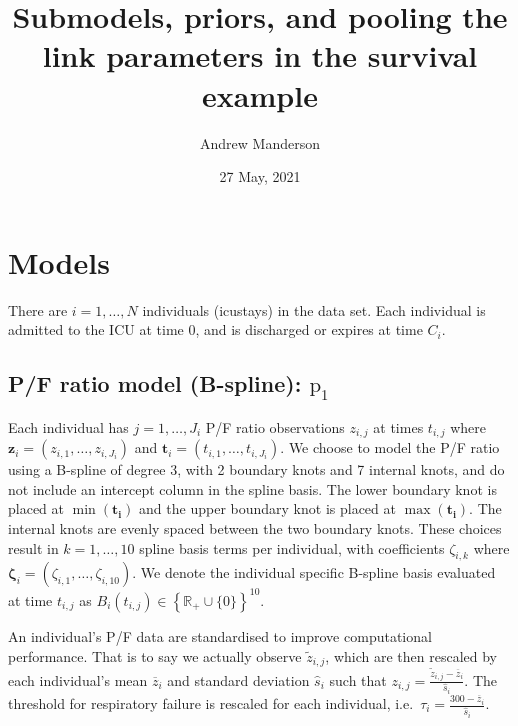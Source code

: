 \documentclass[
  10pt,
  a4paper,
]{article}
\title{Submodels, priors, and pooling the link parameters in the
survival example}
\author{Andrew Manderson}
\date{27 May, 2021}
\newcommand{\pd}{\text{p}}
\begin{document}
\maketitle

\hypertarget{models}{%
\section{Models}\label{models}}

There are \(i = 1, \ldots, N\) individuals (icustays) in the data set.
Each individual is admitted to the ICU at time \(0\), and is discharged
or expires at time \(C_{i}\).

\hypertarget{pf-ratio-model-b-spline-pd_1}{%
\subsection{\texorpdfstring{P/F ratio model (B-spline):
\(\pd_{1}\)}{P/F ratio model (B-spline): \textbackslash pd\_\{1\}}}\label{pf-ratio-model-b-spline-pd_1}}

Each individual has \(j = 1, \ldots, J_{i}\) P/F ratio observations
\(z_{i, j}\) at times \(t_{i, j}\) where
\(\boldsymbol{z}_{i} = (z_{i, 1}, \ldots, z_{i, J_{i}})\) and
\(\boldsymbol{t}_{i} = (t_{i, 1}, \ldots, t_{i, J_{i}})\). We choose to
model the P/F ratio using a B-spline of degree 3, with 2 boundary knots
and 7 internal knots, and do not include an intercept column in the
spline basis. The lower boundary knot is placed at
\(\min(\boldsymbol{t_{i}})\) and the upper boundary knot is placed at
\(\max(\boldsymbol{t_{i}})\). The internal knots are evenly spaced
between the two boundary knots. These choices result in
\(k = 1, \ldots, 10\) spline basis terms per individual, with
coefficients \(\zeta_{i, k}\) where
\(\boldsymbol{\zeta}_{i} = (\zeta_{i, 1}, \ldots, \zeta_{i, 10})\). We
denote the individual specific B-spline basis evaluated at time
\(t_{i, j}\) as
\(B_{i}(t_{i, j}) \in \left\{\mathbb{R}_{+} \cup \{0\}\right\}^{10}\).

An individual's P/F data are standardised to improve computational
performance. That is to say we actually observe \(\tilde{z}_{i, j}\),
which are then rescaled by each individual's mean \(\overline{z}_{i}\)
and standard deviation \(\hat{s}_{i}\) such that
\(z_{i, j} = \frac{\tilde{z}_{i, j} - \overline{z}_{i}}{\hat{s}_{i}}\).
The threshold for respiratory failure is rescaled for each individual,
i.e.~\(\tau_{i} = \frac{300 - \overline{z}_{i}}{\hat{s}_{i}}\).
\end{document}
